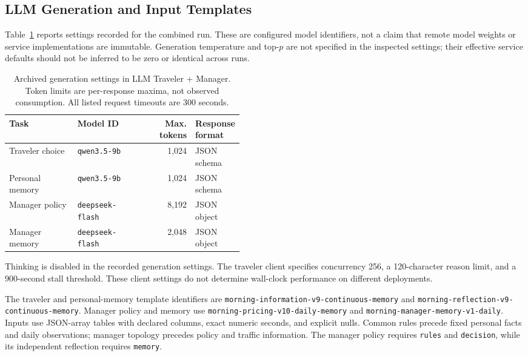 \subsection{LLM Generation and Input Templates}

Table~\ref{tab:llm-settings} reports settings recorded for the combined run. These are configured model identifiers, not a claim that remote model weights or service implementations are immutable. Generation temperature and top-$p$ are not specified in the inspected settings; their effective service defaults should not be inferred to be zero or identical across runs.

\begin{table}[htbp]
\centering\small
\caption{Archived generation settings in LLM Traveler + Manager. Token limits are per-response maxima, not observed consumption. All listed request timeouts are 300 seconds.}
\label{tab:llm-settings}
\begin{tabularx}{\linewidth}{@{}>{\raggedright\arraybackslash}X >{\raggedright\arraybackslash}p{0.26\linewidth}r >{\raggedright\arraybackslash}p{0.19\linewidth}@{}}
\toprule
Task & Model ID & Max. tokens & Response format \\
\midrule
Traveler choice & \texttt{qwen3.5-9b} & 1,024 & JSON schema \\
Personal memory & \texttt{qwen3.5-9b} & 1,024 & JSON schema \\
Manager policy & \texttt{deepseek-flash} & 8,192 & JSON object \\
Manager memory & \texttt{deepseek-flash} & 2,048 & JSON object \\
\bottomrule
\end{tabularx}
\end{table}

Thinking is disabled in the recorded generation settings. The traveler client specifies concurrency 256, a 120-character reason limit, and a 900-second stall threshold. These client settings do not determine wall-clock performance on different deployments.

The traveler and personal-memory template identifiers are \texttt{morning-information-v9-continuous-memory} and \texttt{morning-reflection-v9-continuous-memory}. Manager policy and memory use \texttt{morning-pricing-v10-daily-memory} and \texttt{morning-manager-memory-v1-daily}. Inputs use JSON-array tables with declared columns, exact numeric seconds, and explicit nulls. Common rules precede fixed personal facts and daily observations; manager topology precedes policy and traffic information. The manager policy requires \texttt{rules} and \texttt{decision}, while its independent reflection requires \texttt{memory}.


